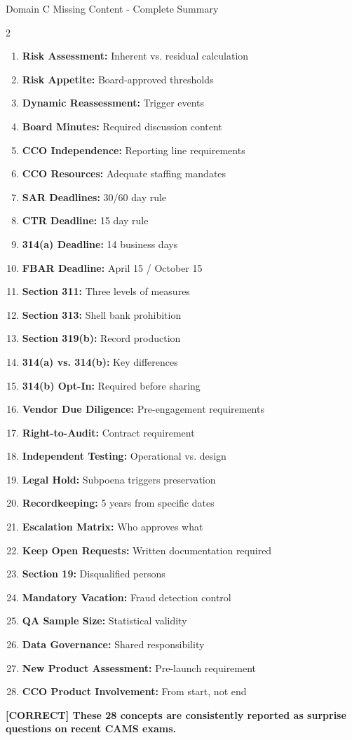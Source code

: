 \documentclass[11pt,a4paper]{beamer}
\newcommand{\greennote}[1]{\textcolor{green!50!black}{\textbf{[CORRECT] #1}}}
\begin{document}
\begin{frame}{Domain C Missing Content - Complete Summary}
\begin{multicols}{2}
\begin{enumerate}
\item \textbf{Risk Assessment:} Inherent vs. residual calculation
\item \textbf{Risk Appetite:} Board-approved thresholds
\item \textbf{Dynamic Reassessment:} Trigger events
\item \textbf{Board Minutes:} Required discussion content
\item \textbf{CCO Independence:} Reporting line requirements
\item \textbf{CCO Resources:} Adequate staffing mandates
\item \textbf{SAR Deadlines:} 30/60 day rule
\item \textbf{CTR Deadline:} 15 day rule
\item \textbf{314(a) Deadline:} 14 business days
\item \textbf{FBAR Deadline:} April 15 / October 15
\item \textbf{Section 311:} Three levels of measures
\item \textbf{Section 313:} Shell bank prohibition
\item \textbf{Section 319(b):} Record production
\item \textbf{314(a) vs. 314(b):} Key differences
\item \textbf{314(b) Opt-In:} Required before sharing
\item \textbf{Vendor Due Diligence:} Pre-engagement requirements
\item \textbf{Right-to-Audit:} Contract requirement
\item \textbf{Independent Testing:} Operational vs. design
\item \textbf{Legal Hold:} Subpoena triggers preservation
\item \textbf{Recordkeeping:} 5 years from specific dates
\item \textbf{Escalation Matrix:} Who approves what
\item \textbf{Keep Open Requests:} Written documentation required
\item \textbf{Section 19:} Disqualified persons
\item \textbf{Mandatory Vacation:} Fraud detection control
\item \textbf{QA Sample Size:} Statistical validity
\item \textbf{Data Governance:} Shared responsibility
\item \textbf{New Product Assessment:} Pre-launch requirement
\item \textbf{CCO Product Involvement:} From start, not end
\end{enumerate}
\end{multicols}
\greennote{These 28 concepts are consistently reported as surprise questions on recent CAMS exams.}
\end{frame}
\end{document}
